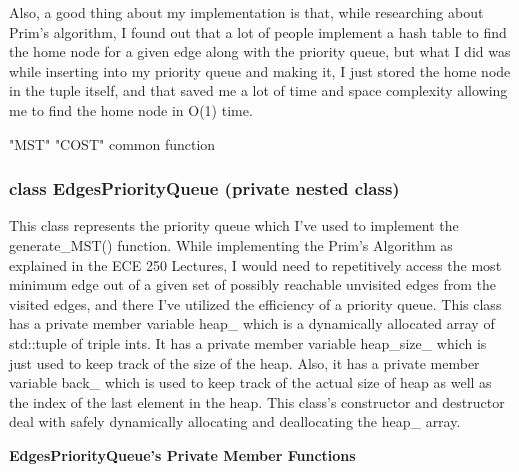 			 Also, a good thing about my implementation is that, while researching about Prim's algorithm, I found out that a lot 
			 of people implement a hash table to find the home node for a given edge along with the priority queue, but what I did was while inserting into my 
			 priority queue and making it, I just stored the home node in the tuple itself, and that saved me a lot of time and space complexity allowing me to find the home node in 
			 {\color{lightblue}O(1)} time.
			 
			 {\color{GoldenYellow}"MST"} {\color{GoldenYellow}"COST"} {\color{pink}common function}

		\subsubsection{{\color{orange}class} {\color{draculapurple}EdgesPriorityQueue} (private nested class)}

			This class represents the priority queue which I've used to implement the {\color{draculapurple}generate\_MST}() function. 
			While implementing the Prim's Algorithm as explained in the ECE 250 Lectures, 
			I would need to repetitively access the most minimum edge out of a given set of possibly reachable unvisited edges 
			from the visited edges, and there I've utilized the efficiency of a priority queue.
			This class has a private member variable {\color{Turquoise}heap\_} which is a dynamically allocated array of 
			{\color{draculapurple}std::tuple} of triple {\color{draculapurple}int}s. It has a private member variable 
			{\color{Turquoise}heap\_size\_} which is just used to keep track of the size of the heap.
			Also, it has a private member variable {\color{Turquoise}back\_} which is used to keep track of the actual 
			size of heap as well as the index of the last element in the heap.
			This class's constructor and destructor deal with safely dynamically allocating and deallocating the 
			{\color{Turquoise}heap\_} array. 
	

			\begin{center}
				\xdash[6em] \textbf{EdgesPriorityQueue's Private Member Functions} \xdash[6em]
			\end{center}

